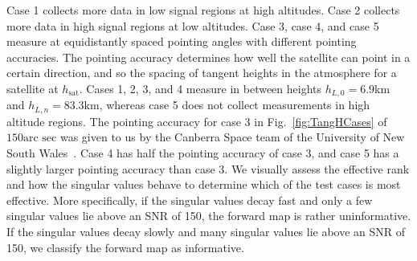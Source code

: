 Case 1 collects more data in low signal regions at high altitudes.
Case 2 collects more data in high signal regions at low altitudes.
Case 3, case 4, and case 5 measure at equidistantly spaced pointing angles with different pointing accuracies.
The pointing accuracy determines how well the satellite can point in a certain direction, and so the spacing of tangent heights in the atmosphere for a satellite at $h_{\text{sat}}$.
Cases 1, 2, 3, and 4 measure in between heights $h_{L,0} = 6.9$km and $h_{L,n} = 83.3$km, whereas case 5 does not collect measurements in high altitude regions.
The pointing accuracy for case 3 in Fig.~\ref{fig:TangHCases} of $150\text{arc sec}$ was given to us by the Canberra Space team of the University of New South Wales~\cite{CubeSatInternal}.
Case 4 has half the pointing accuracy of case 3, and case 5 has a slightly larger pointing accuracy than case 3.
We visually assess the effective rank and how the singular values behave to determine which of the test cases is most effective.
More specifically, if the singular values decay fast and only a few singular values lie above an SNR of 150, the forward map is rather uninformative.
If the singular values decay slowly and many singular values lie above an SNR of 150, we classify the forward map as informative.

